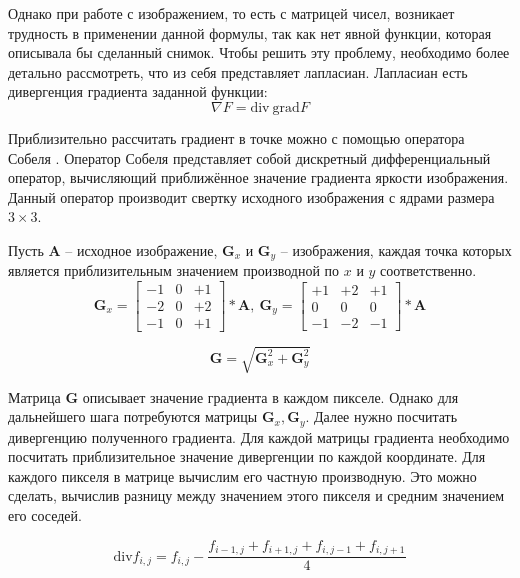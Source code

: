 Однако при работе с изображением, то есть с матрицей чисел, возникает трудность в применении данной формулы, так как нет явной функции, которая описывала бы сделанный снимок. Чтобы решить эту проблему, необходимо более детально рассмотреть, что из себя представляет лапласиан. Лапласиан есть дивергенция градиента заданной функции:
\begin{equation}
	\nabla F = \text{div}\ \text{grad} F
\end{equation}

Приблизительно рассчитать градиент в точке можно с помощью оператора Собеля \cite{SobelOperator}. Оператор Собеля представляет собой дискретный дифференциальный оператор, вычисляющий приближённое значение градиента яркости изображения. Данный оператор производит свертку исходного изображения с ядрами размера $3 \times 3$.

Пусть \textbf{A} -- исходное изображение, $\textbf{G}_x$ и $\textbf{G}_y$ -- изображения, каждая точка которых является приблизительным значением производной по $x$ и $y$ соответственно.
\begin{equation}
	\textbf{G}_x =
	\begin{bmatrix}
		-1 & 0 & +1\\
		-2 & 0 & +2\\
		-1 & 0 & +1
	\end{bmatrix}
	* \textbf{A},\ 
	\textbf{G}_y =
	\begin{bmatrix}
		+1 & +2 & +1\\
		0 & 0 & 0\\
		-1 & -2 & -1
	\end{bmatrix}
	* \textbf{A}
\end{equation}

\begin{equation}
	\textbf{G} = \sqrt{\textbf{G}_x^2 + \textbf{G}_y^2}
\end{equation}

Матрица \textbf{G} описывает значение градиента в каждом пикселе. Однако для дальнейшего шага потребуются матрицы $\textbf{G}_x, \textbf{G}_y$. Далее нужно посчитать дивергенцию полученного градиента. Для каждой матрицы градиента необходимо посчитать приблизительное значение дивергенции по каждой координате. Для каждого пикселя в матрице вычислим его частную производную. Это можно сделать, вычислив разницу между значением этого пикселя и средним значением его соседей.

\begin{equation}
	\text{div} f_{i,j} = f_{i,j} - \dfrac{f_{i-1,j} + f_{i+1,j} + f_{i,j-1} + f_{i,j+1}}{4}
\end{equation}

